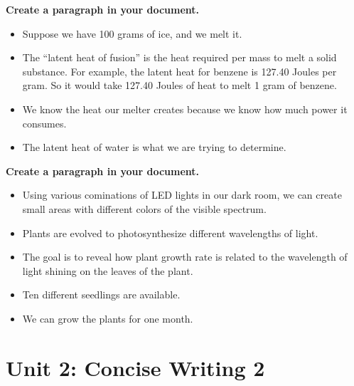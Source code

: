 \documentclass{article}
\begin{document}
\begin{enumerate}
\textbf{Create a paragraph in your document.} 
\begin{itemize}
\item Suppose we have 100 grams of ice, and we melt it.
\item The ``latent heat of fusion'' is the heat required per mass to melt a solid substance.  For example, the latent heat for benzene is 127.40 Joules per gram.  So it would take 127.40 Joules of heat to melt 1 gram of benzene.
\item We know the heat our melter creates because we know how much power it consumes.
\item The latent heat of water is what we are trying to determine.
\end{itemize}
\textbf{Create a paragraph in your document.} 
\begin{itemize}
\item Using various cominations of LED lights in our dark room, we can create small areas with different colors of the visible spectrum.
\item Plants are evolved to photosynthesize different wavelengths of light.
\item The goal is to reveal how plant growth rate is related to the wavelength of light shining on the leaves of the plant.
\item Ten different seedlings are available.
\item We can grow the plants for one month.
\end{itemize}
\end{enumerate}

\section{Unit 2: Concise Writing 2}
\end{document}
